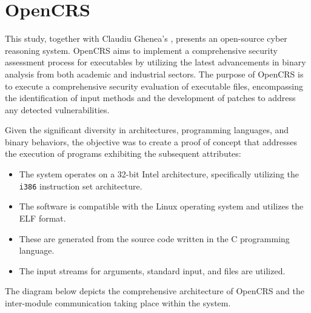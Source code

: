 \documentclass[../main.tex]{subfiles}
\begin{document}
\hypertarget{opencrs}{%
\chapter{OpenCRS}\label{opencrs}}

This study, together with Claudiu Ghenea's \cite{ghenea}, presents an open-source
cyber reasoning system. OpenCRS aims to implement a comprehensive
security assessment process for executables by utilizing the latest
advancements in binary analysis from both academic and industrial
sectors. The purpose of OpenCRS is to execute a comprehensive security
evaluation of executable files, encompassing the identification of input
methods and the development of patches to address any detected
vulnerabilities.

Given the significant diversity in architectures, programming languages,
and binary behaviors, the objective was to create a proof of concept
that addresses the execution of programs exhibiting the subsequent
attributes:

\begin{itemize}
\tightlist
\item
  The system operates on a 32-bit Intel architecture, specifically
  utilizing the \texttt{i386} instruction set architecture.
\item
  The software is compatible with the Linux operating system and
  utilizes the ELF format.
\item
  These are generated from the source code written in the C programming
  language.
\item
  The input streams for arguments, standard input, and files are
  utilized.
\end{itemize}

The diagram below depicts the comprehensive architecture of OpenCRS and
the inter-module communication taking place within the system.
\end{document}
